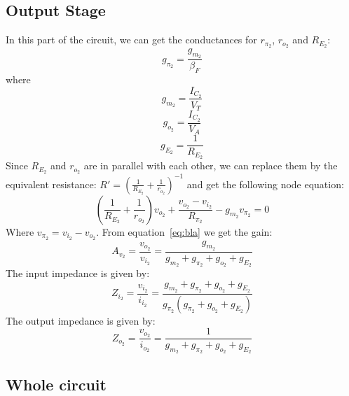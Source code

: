 \subsection{Output Stage}
In this part of the circuit, we can get the conductances for $r_{\pi_2}$, $r_{o_2}$ and $R_{E_2}$:
\begin{equation}
    g_{\pi_2}=\frac{g_{m_2}}{\beta_F}
\end{equation}
where
\begin{equation}
    g_{m_2}=\frac{I_{C_2}}{V_T}
\end{equation}
\begin{equation}
    g_{o_2}=\frac{I_{C_2}}{V_A}
\end{equation}
\begin{equation}
    g_{E_2}=\frac{1}{R_{E_2}}
\end{equation}
Since $R_{E_2}$ and $r_{o_2}$ are in parallel with each other, we can replace them by the equivalent resistance: $R'=\left(\frac{1}{R_{E_2}}+\frac{1}{r_{o_2}}\right)^{-1}$ and get the following node equation:
\begin{equation}\label{eq:bla}
    \left(\frac{1}{R_{E_2}}+\frac{1}{r_{o_2}}\right)v_{o_2}+\frac{v_{o_2}-v_{i_2}}{R_{\pi_2}}-g_{m_2}v_{\pi_2}=0
\end{equation}
Where $v_{\pi_2}=v_{i_2}-v_{o_2}$. From equation~\ref{eq:bla} we get the gain:
\begin{equation}
    A_{v_2}=\frac{v_{o_2}}{v_{i_2}}=\frac{g_{m_2}}{g_{m_2}+g_{\pi_2}+g_{o_2}+g_{E_2}}
\end{equation}
The input impedance is given by:
\begin{equation}
    Z_{i_2}=\frac{v_{i_2}}{i_{i_2}}= \frac{g_{m_2}+g_{\pi_2}+g_{o_2}+g_{E_2}}{g_{\pi_2}(g_{\pi_2}+g_{o_2}+g_{E_2})}
\end{equation}
The output impedance is given by:
\begin{equation}
    Z_{o_2}=\frac{v_{o_2}}{i_{o_2}}= \frac{1}{g_{m_2}+g_{\pi_2}+g_{o_2}+g_{E_2}}
\end{equation}


\subsection{Whole circuit}
